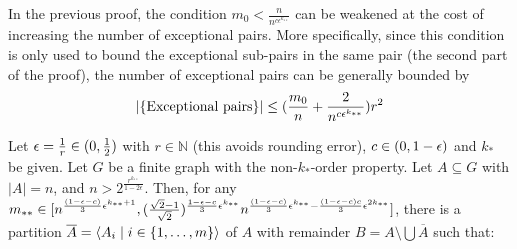     \begin{remark}[Remark 4.15]
        In the previous proof, the condition $m_0 < \frac{n}{n^{c\epsilon^{k_{**}}}}$ can be
        weakened at the cost of increasing the number of exceptional pairs.
        More specifically, since this condition is only used to bound the exceptional sub-pairs in the same pair
        (the second part of the proof), the number of exceptional pairs can be generally bounded by
        \[
            |\{ \text{Exceptional pairs} \}|
                \leq ( \frac{m_0}{n} + \frac{2}{n^{c\epsilon^{k_{**}}}} ) r^2
        \]
    \end{remark}


    \begin{theorem}[Theorem 4.16] \label{thm:existance_of_equitative_partition_with_perfect_pairs_but_with_bound_exceptional_pairs}
        Let $\epsilon = \frac{1}{r} \in ( 0, \frac{1}{2} )$ with $r \in \mathbb{N}$ (this avoids rounding error),
        $c\in ( 0,1-\epsilon )$ and $k_*$ be given.
        Let $G$ be a finite graph with the non-$k_*$-order property.
        Let $A \subseteq G$ with $|A| = n$, and $n > 2^{\frac{r^{k_{**}}}{1-2\epsilon}}$.
        Then, for any $m_{**} \in [ n^{\frac{(1-\epsilon-c)}{3}\epsilon^{k_{**}+1}},
        ( \frac{\sqrt{2}-1}{\sqrt{2}} )^{\frac{1-\epsilon-c}{3}\epsilon^{k_{**}}} n^{\frac{(1-\epsilon-c)}{3}\epsilon^{k_{**}} -
        \frac{(1-\epsilon-c)c}{3}\epsilon^{2k_{**}}} ]$, there is a partition
        $\overline{A} = \left< A_i \mid i \in \{ 1, \dots, m \} \right>$ of $A$ with remainder
        $B = A \setminus \bigcup \overline{A}$ such that:
\end{theorem}
